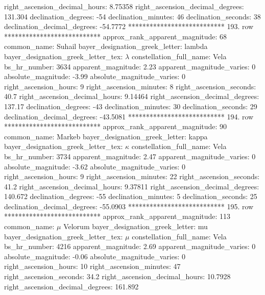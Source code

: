      right_ascension_decimal_hours: 8.75358
   right_ascension_decimal_degrees: 131.304
               declination_degrees: -54
               declination_minutes: 46
               declination_seconds: 38
       declination_decimal_degrees: -54.7772
*************************** 193. row ***************************
    approx_rank_apparent_magnitude: 68
                       common_name: Suhail
    bayer_designation_greek_letter: lambda
bayer_designation_greek_letter_tex: $\lambda$
           constellation_full_name: Vela
                      bs_hr_number: 3634
                apparent_magnitude: 2.23
         apparent_magnitude_varies: 0
                absolute_magnitude: -3.99
         absolute_magnitude_varies: 0
             right_ascension_hours: 9
           right_ascension_minutes: 8
           right_ascension_seconds: 40.7
     right_ascension_decimal_hours: 9.14464
   right_ascension_decimal_degrees: 137.17
               declination_degrees: -43
               declination_minutes: 30
               declination_seconds: 29
       declination_decimal_degrees: -43.5081
*************************** 194. row ***************************
    approx_rank_apparent_magnitude: 90
                       common_name: Markeb
    bayer_designation_greek_letter: kappa
bayer_designation_greek_letter_tex: $\kappa$
           constellation_full_name: Vela
                      bs_hr_number: 3734
                apparent_magnitude: 2.47
         apparent_magnitude_varies: 0
                absolute_magnitude: -3.62
         absolute_magnitude_varies: 0
             right_ascension_hours: 9
           right_ascension_minutes: 22
           right_ascension_seconds: 41.2
     right_ascension_decimal_hours: 9.37811
   right_ascension_decimal_degrees: 140.672
               declination_degrees: -55
               declination_minutes: 5
               declination_seconds: 25
       declination_decimal_degrees: -55.0903
*************************** 195. row ***************************
    approx_rank_apparent_magnitude: 113
                       common_name: $\mu$ Velorum
    bayer_designation_greek_letter: mu
bayer_designation_greek_letter_tex: $\mu$
           constellation_full_name: Vela
                      bs_hr_number: 4216
                apparent_magnitude: 2.69
         apparent_magnitude_varies: 0
                absolute_magnitude: -0.06
         absolute_magnitude_varies: 0
             right_ascension_hours: 10
           right_ascension_minutes: 47
           right_ascension_seconds: 34.2
     right_ascension_decimal_hours: 10.7928
   right_ascension_decimal_degrees: 161.892
